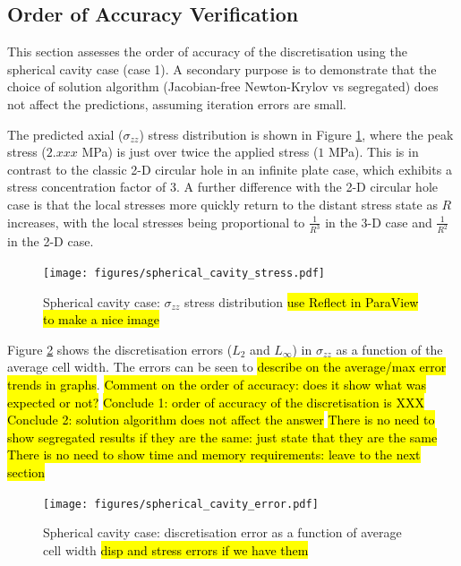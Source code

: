 \documentclass[sn-mathphys,Numbered,draft]{sn-jnl}%
\begin{document}
\subsection{Order of Accuracy Verification}

This section assesses the order of accuracy of the discretisation using the spherical cavity case (case 1).
A secondary purpose is to demonstrate that the choice of solution algorithm (Jacobian-free Newton-Krylov vs segregated) does not affect the predictions, assuming iteration errors are small.

The predicted axial ($\sigma_{zz}$) stress distribution is shown in Figure \ref{fig:spherical_cavity_stress}, where the peak stress ($2.xxx$ MPa) is just over twice the applied stress ($1$ MPa).
This is in contrast to the classic 2-D circular hole in an infinite plate case, which exhibits a stress concentration factor of 3.
A further difference with the 2-D circular hole case is that the local stresses more quickly return to the distant stress state as $R$ increases, with the local stresses being proportional to $\frac{1}{R^3}$ in the 3-D case and  $\frac{1}{R^2}$ in the 2-D case.
\begin{figure}[htbp]
   \centering
   \texttt{[image: figures/spherical\_cavity\_stress.pdf]} 
   \caption{Spherical cavity case: $\sigma_{zz}$ stress distribution \hl{use Reflect in ParaView to make a nice image}}
   \label{fig:spherical_cavity_stress}
\end{figure}

Figure \ref{fig:spherical_cavity_accuracy} shows the discretisation errors ($L_2$ and $L_\infty$) in $\sigma_{zz}$ as a function of the average cell width.
The errors can be seen to \hl{describe on the average/max error trends in graphs}.
\hl{Comment on the order of accuracy: does it show what was expected or not?}
\hl{Conclude 1: order of accuracy of the discretisation is XXX}
\hl{Conclude 2: solution algorithm does not affect the answer}
\hl{There is no need to show segregated results if they are the same: just state that they are the same}
\hl{There is no need to show time and memory requirements: leave to the next section}
\begin{figure}[htbp]
   \centering
   \texttt{[image: figures/spherical\_cavity\_error.pdf]} 
   \caption{Spherical cavity case: discretisation error as a function of average cell width \hl{disp and stress errors if we have them}}
   \label{fig:spherical_cavity_accuracy}
\end{figure}
\end{document}
